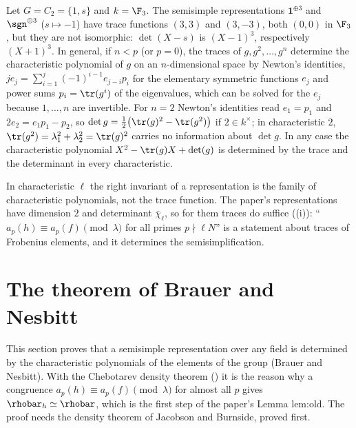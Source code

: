 \begin{example}\label{ex:reps:traces-fail}
Let $G=C_2=\{1,s\}$ and $k=\F_3$. The semisimple representations $\mathbf1^{\oplus3}$ and $\sgn^{\oplus3}$ ($s\mapsto-1$) have trace functions $(3,3)$ and
$(3,-3)$, both $(0,0)$ in $\F_3$, but they are not isomorphic: $\det(X-s)$ is $(X-1)^3$, respectively $(X+1)^3$. In general, if $n<p$ (or
$p=0$), the traces of $g,g^2,\dots,g^n$ determine the characteristic polynomial of $g$ on an $n$-dimensional space by Newton's identities,
$je_j=\sum_{i=1}^{j}(-1)^{i-1}e_{j-i}p_i$ for the elementary symmetric functions $e_j$ and power sums $p_i=\tr(g^i)$ of the eigenvalues, which
can be solved for the $e_j$ because $1,\dots,n$ are invertible. For $n=2$ Newton's identities read $e_1=p_1$ and $2e_2=e_1p_1-p_2$, so $\det g=\frac12\bigl(\tr(g)^2-\tr(g^2)\bigr)$ if $2\in k^\times$; in
characteristic $2$, $\tr(g^2)=\lambda_1^2+\lambda_2^2=\tr(g)^2$ carries no information about $\det g$. In any case the characteristic polynomial
$X^2-\tr(g)X+\det(g)$ is determined by the trace and the determinant in every characteristic.
\end{example}

\begin{warning}
In characteristic $\ell$ the right invariant of a representation is the family of characteristic polynomials, not the trace function.
The paper's representations have dimension $2$ and determinant $\bar\chi_\ell$, so for them traces do suffice
((i)): ``$a_p(h)\equiv a_p(f)\pmod\lambda$ for all primes $p\nmid\ell N$'' is a statement about traces of Frobenius
elements, and it determines the semisimplification.
\end{warning}

\section{The theorem of Brauer and Nesbitt}\label{sec:reps:brauer-nesbitt}

This section proves that a semisimple representation over any field is determined by the characteristic polynomials of the
elements of the group (Brauer and Nesbitt). With the Chebotarev density theorem () it is the reason why a congruence
$a_p(h)\equiv a_p(f)\pmod\lambda$ for almost all $p$ gives $\rhobar_h\simeq\rhobar$, which is the first step of the paper's Lemma lem:old. The proof needs the
density theorem of Jacobson and Burnside, proved first.

